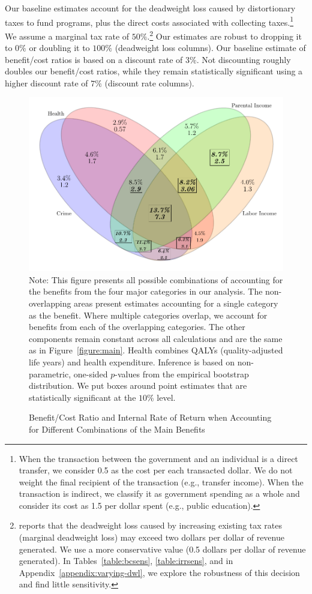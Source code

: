 Our baseline estimates account for the deadweight loss caused by distortionary taxes to fund programs, plus the direct costs associated with collecting taxes.\footnote{When the transaction between the government and an individual is a direct transfer, we consider 0.5 as the cost per each transacted dollar. We do not weight the final recipient of the transaction (e.g., transfer income). When the transaction is indirect, we classify it as government spending as a whole and consider its cost as 1.5 per dollar spent (e.g., public education).} We assume a marginal tax rate of $50\%$.\footnote{\citet{Feldstein_1999_REStat} reports that the deadweight loss caused by increasing existing tax rates (marginal deadweight loss) may exceed two dollars per dollar of revenue generated. We use a more conservative value (0.5 dollars per dollar of revenue generated). In Tables~\ref{table:bcsens}, \ref{table:irrsens}, and in  Appendix~\ref{appendix:varying-dwl}, we explore the robustness of this decision and find little sensitivity.} Our estimates are robust to dropping it to $0\%$ or doubling it to $100\%$ (deadweight loss columns). Our baseline estimate of benefit/cost ratios is based on a discount rate of $3\%$. Not discounting roughly doubles our benefit/cost ratios, while they remain statistically significant using a higher discount rate of $7\%$ (discount rate columns).

\begin{figure}[!htbp]
\caption{Benefit/Cost Ratio and Internal Rate of Return when Accounting for Different Combinations of the Main Benefits}\label{figure:vennpooled}
\centering
\includegraphics[width=.7\columnwidth]{output/venn_pooled.pdf}
\footnotesize \justify
Note: This figure presents all possible combinations of accounting for the benefits from the four major categories in our analysis. The non-overlapping areas present estimates accounting for a single category as the benefit. Where multiple categories overlap, we account for benefits from each of the overlapping categories. The other components remain constant across all calculations and are the same as in Figure~\ref{figure:main}. Health combines QALYs (quality-adjusted life years) and health expenditure. Inference is based on non-parametric, one-sided $p$-values from the empirical bootstrap distribution. We put boxes around point estimates that are statistically significant at the $10\%$ level.
\end{figure}


